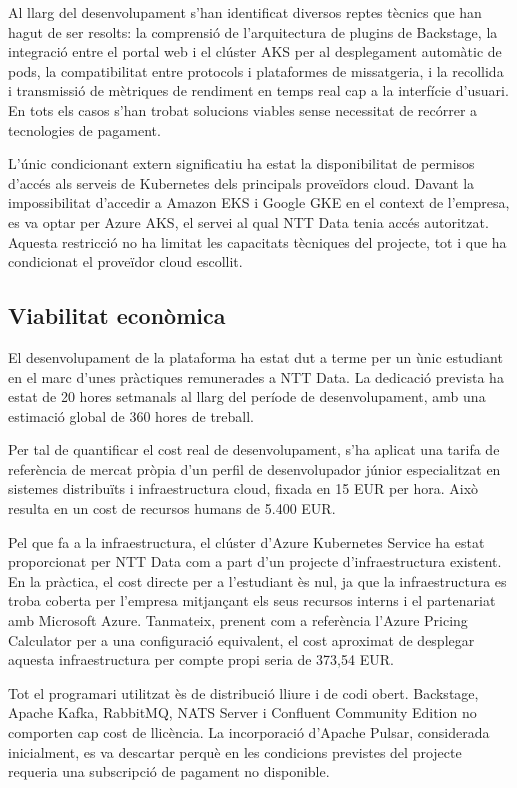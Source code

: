 \documentclass[11pt,a4paper]{article}
\begin{document}
Al llarg del desenvolupament s'han identificat diversos reptes t\`ecnics que han hagut de ser resolts: la comprensi\'o de l'arquitectura de plugins de Backstage, la integraci\'o entre el portal web i el cl\'uster AKS per al desplegament autom\`atic de pods, la compatibilitat entre protocols i plataformes de missatgeria, i la recollida i transmissi\'o de m\`etriques de rendiment en temps real cap a la interf\'icie d'usuari. En tots els casos s'han trobat solucions viables sense necessitat de rec\'orrer a tecnologies de pagament.

L'\'unic condicionant extern significatiu ha estat la disponibilitat de permisos d'acc\'es als serveis de Kubernetes dels principals prove\"idors cloud. Davant la impossibilitat d'accedir a Amazon EKS i Google GKE en el context de l'empresa, es va optar per Azure AKS, el servei al qual NTT Data tenia acc\'es autoritzat. Aquesta restricci\'o no ha limitat les capacitats t\`ecniques del projecte, tot i que ha condicionat el prove\"idor cloud escollit.

\subsection{Viabilitat econ\`omica}
El desenvolupament de la plataforma ha estat dut a terme per un \`unic estudiant en el marc d'unes pr\`actiques remunerades a NTT Data. La dedicaci\'o prevista ha estat de 20 hores setmanals al llarg del per\'iode de desenvolupament, amb una estimaci\'o global de 360 hores de treball.

Per tal de quantificar el cost real de desenvolupament, s'ha aplicat una tarifa de refer\`encia de mercat pr\`opia d'un perfil de desenvolupador j\'unior especialitzat en sistemes distribu\"its i infraestructura cloud, fixada en 15 EUR per hora. Aix\`o resulta en un cost de recursos humans de 5.400 EUR.

Pel que fa a la infraestructura, el cl\'uster d'Azure Kubernetes Service ha estat proporcionat per NTT Data com a part d'un projecte d'infraestructura existent. En la pr\`actica, el cost directe per a l'estudiant \`es nul, ja que la infraestructura es troba coberta per l'empresa mitjan\c{c}ant els seus recursos interns i el partenariat amb Microsoft Azure. Tanmateix, prenent com a refer\`encia l'Azure Pricing Calculator per a una configuraci\'o equivalent, el cost aproximat de desplegar aquesta infraestructura per compte propi seria de 373,54 EUR.

Tot el programari utilitzat \`es de distribuci\'o lliure i de codi obert. Backstage, Apache Kafka, RabbitMQ, NATS Server i Confluent Community Edition no comporten cap cost de llic\`encia. La incorporaci\'o d'Apache Pulsar, considerada inicialment, es va descartar perqu\`e en les condicions previstes del projecte requeria una subscripci\'o de pagament no disponible.
\end{document}
